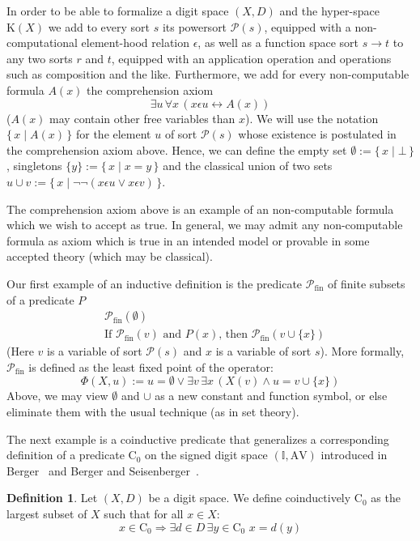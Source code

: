 \documentclass[microtype]{jloganal}
\theoremstyle{plain}
\theoremstyle{definition}
\newtheorem{definition}[theorem]{Definition}
\newcommand{\II}{\mathbb{I}}
\newcommand{\AV}{\mathrm{AV}}
\newcommand{\coco}{\mathrm{C}}
\newcommand{\compact}{\mathrm{K}}
\newcommand{\set}[2]{\mbox{$\{\,#1 \mid #2 \,\}$}}
\newcommand{\pow}[1]{\mathcal{P}(#1)}
\newcommand{\powf}[1]{\mathcal{P}_{\mathrm{fin}}}
\begin{document}
In order to be able to formalize a digit space $(X,D)$ and the hyper-space
$\compact(X)$ we add to every sort $s$ its powersort $\pow{s}$,
equipped with a non-computational element-hood relation $\epsilon$,
as well as a
function space sort $s\to t$ to any two sorts $r$ and $t$,
equipped with an application operation and operations such as composition
and the like. Furthermore, we add for every non-computable formula $A(x)$ the 
comprehension axiom
\[ \exists u\, \forall x\, (x \epsilon u \leftrightarrow A(x)) \]
($A(x)$ may contain other free variables than $x$).
We will use the notation $\set{x}{A(x)}$ for the element $u$ of sort
$\pow{s}$ whose existence is postulated in the comprehension axiom above.
Hence, we can define the empty set $\emptyset := \set{x}{\bot}$,
singletons $\{y\} := \set{x}{x = y}$ and the classical union of two sets
$u\cup v := \set{x}{\neg\neg (x \epsilon u \lor x \epsilon v)}$.

The comprehension axiom above is an example of an non-computable formula which we
wish to accept as true. In general, we may admit any non-computable formula
as axiom which is true in an intended model or provable in some
accepted theory (which may be classical).

Our first example of an inductive definition is the predicate $\powf{P}$ of
finite subsets of a predicate $P$
\begin{align*}
& \powf{P}(\emptyset)\\
& \text{If $\powf{P}(v)$ and $P(x)$, then $\powf{P}(v \cup \{x\})$}
\end{align*}
(Here $v$ is a variable of sort $\pow{s}$ and $x$ is a variable of sort $s$).
More formally, $\powf{P}$ is defined as the least fixed point of the operator:
\[\Phi(X,u) := u = \emptyset \lor \exists v\,\exists x\,(X(v) \land 
                                          u =  v \cup \{x\}) \]
Above, we may view $\emptyset$ and $\cup$ as a new constant and function
symbol, or else eliminate them with the usual technique (as in set theory).


The next example is a coinductive predicate that generalizes a corresponding
definition of a predicate $\coco_0$ on the signed digit space $(\II,\AV)$
introduced in Berger~\cite{Berger11} and Berger and Seisenberger~\cite{SeisenBerger10}.
\begin{definition}
\label{def-coco}
Let $(X,D)$ be a digit space.
We define coinductively $\coco_0$ as the largest subset of $X$ such that 
for all $x \in X$:
\[
x \in \coco_0 \Rightarrow \exists d \in D\, \exists y \in \coco_0\,\, x = d(y)
\]
\end{definition}
\end{document}
